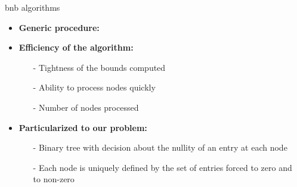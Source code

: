\documentclass[final]{beamer}
\newlength{\sepwid}
\newlength{\onecolwid}
\newlength{\twocolwid}
\newcommand{\emphone}[1]{{\color{norange}#1}}
\begin{document}
\begin{frame}[t]
\begin{columns}[t]
\begin{column}{\sepwid}\end{column}

\begin{column}{\twocolwid}    
    \begin{columns}[t,totalwidth=\twocolwid]
        \begin{column}{\onecolwid}\vspace{-.6in} 
            
            \begin{block}{\gls{bnb} algorithms}
                \begin{itemize}
                    \item \hspace*{0.1em} \textbf{Generic procedure:}
                \end{itemize}
                \vspace*{1em}
                 
                \vspace*{1em}
                \begin{itemize}
                    \item \hspace*{0.1em} \textbf{Efficiency of the algorithm:}
                    \begin{itemize}
                        \normalsize 
                        \item[-] \hspace*{0.1em} Tightness of the bounds computed
                        \item[-] \hspace*{0.1em} Ability to process nodes quickly
                        \item[-] \hspace*{0.1em} \emphone{Number of nodes processed}
                    \end{itemize}
                \end{itemize}
                \begin{itemize}
                    \item \hspace*{0.1em} \textbf{Particularized to our problem:}
                    \begin{itemize}
                        \normalsize \justifying \item[-] \hspace*{0.1em} Binary tree with decision about the \emphone{nullity of an entry} at each node
                        \item[-] \hspace*{0.1em} Each node is uniquely defined by the set of entries forced to \emphone{zero} and to \emphone{non-zero}
                    \end{itemize}
                \end{itemize}
            \end{block}
        \end{column}


\end{columns}
\end{column}
\end{columns}
\end{frame}
\end{document}
